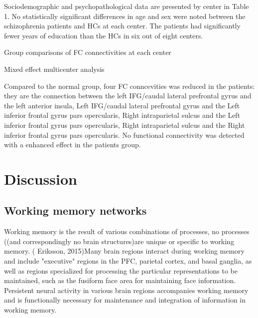 \documentclass[preprint,authoryear,review,12pt]{elsarticle}
\begin{document}
Sociodemographic and psychopathological data are presented by center in Table 1. No statistically significant differences in age and sex were noted between the schizophrenia patients and HCs at each center. The patients had significantly fewer years of education than the HCs in six out of eight centers.

Group comparisons of FC connectivities at each center

Mixed effect multicenter analysis

Compared to the normal group, four FC conncevities was reduced in the patients: they are the connection between the left IFG/caudal lateral prefrontal gyrus and the left anterior insula, Left IFG/caudal lateral prefrontal gyrus and the Left inferior frontal gyrus pars opercularis, Right intraparietal sulcus and the Left inferior frontal gyrus pars opercularis, Right intraparietal sulcus and the Right inferior frontal gyrus pars opercularis. No functional connectivity was detected with a enhanced effect in the patients group.  

\section*{Discussion} 

\subsection*{Working memory networks}


Working memory is the result of various combinations of processes, no processes ((and correspondingly no brain structures)are unique or specific to working memory. ( Eriksson, 2015)Many brain regions interact during working memory and include "executive" regions in the PFC, parietal cortex, and basal ganglia, as well as regions specialized for processing the particular representations to be maintained, such as the fusiform face area for maintaining face information. Persistent neural activity in various brain regions accompanies working memory and is functionally necessary for maintenance and integration of information in working memory.
\end{document}
